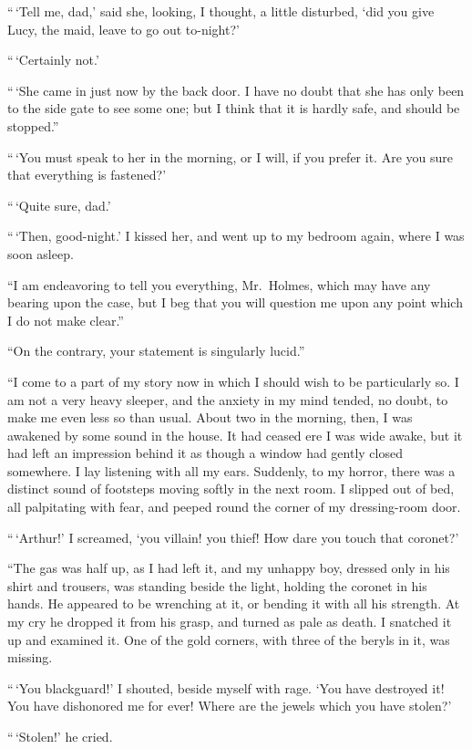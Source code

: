 “\,‘Tell me, dad,’ said she, looking, I thought, a little disturbed,
‘did you give Lucy, the maid, leave to go out to-night?’

“\,‘Certainly not.’

“\,‘She came in just now by the back door. I have no
doubt that she has only been to the side gate to see some one;
but I think that it is hardly safe, and should be stopped.”

“\,‘You must speak to her in the morning, or I will, if you
prefer it. Are you sure that everything is fastened?’

“\,‘Quite sure, dad.’

“\,‘Then, good-night.’ I kissed her, and went up to my bedroom
again, where I was soon asleep.

“I am endeavoring to tell you everything, Mr.~Holmes,
which may have any bearing upon the case, but I beg that you
will question me upon any point which I do not make clear.”

“On the contrary, your statement is singularly lucid.”

“I come to a part of my story now in which I should wish
to be particularly so. I am not a very heavy sleeper, and the
anxiety in my mind tended, no doubt, to make me even less
so than usual. About two in the morning, then, I was awakened
by some sound in the house. It had ceased ere I was
wide awake, but it had left an impression behind it as though
a window had gently closed somewhere. I lay listening with
all my ears. Suddenly, to my horror, there was a distinct
sound of footsteps moving softly in the next room. I slipped
out of bed, all palpitating with fear, and peeped round the
corner of my dressing-room door.

“\,‘Arthur!’ I screamed, ‘you villain! you thief! How
dare you touch that coronet?’

“The gas was half up, as I had left it, and my unhappy
boy, dressed only in his shirt and trousers, was standing beside
the light, holding the coronet in his hands. He appeared
to be wrenching at it, or bending it with all his strength. At
my cry he dropped it from his grasp, and turned as pale as
death. I snatched it up and examined it. One of the gold
corners, with three of the beryls in it, was missing.

“\,‘You blackguard!’ I shouted, beside myself with rage.
‘You have destroyed it! You have dishonored me for ever!
Where are the jewels which you have stolen?’

“\,‘Stolen!’ he cried.

